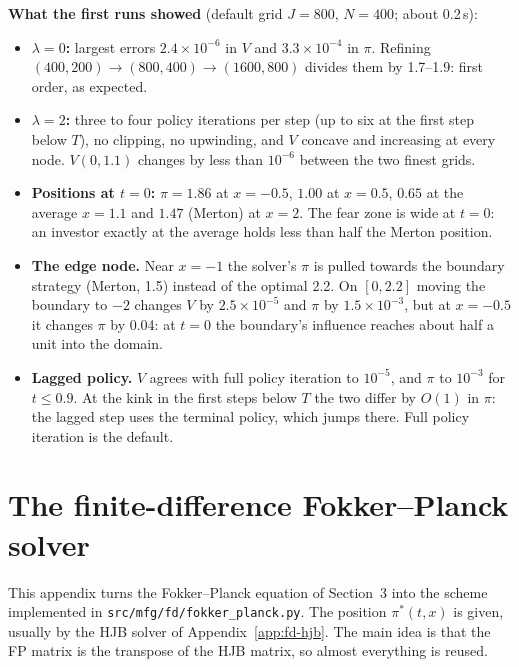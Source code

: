 \documentclass[11pt]{article}
\begin{document}
\textbf{What the first runs showed} (default grid $J=800$, $N=400$; about 0.2\,s):
\begin{itemize}
  \item \textbf{$\lambda=0$:} largest errors $2.4\times10^{-6}$ in $V$ and $3.3\times10^{-4}$ in
        $\pi$. Refining $(400,200)\to(800,400)\to(1600,800)$ divides them by 1.7--1.9: first
        order, as expected.
  \item \textbf{$\lambda=2$:} three to four policy iterations per step (up to six at the first
        step below $T$), no clipping, no upwinding, and $V$ concave and increasing at every
        node. $V(0,1.1)$ changes by less than $10^{-6}$ between the two finest grids.
  \item \textbf{Positions at $t=0$:} $\pi=1.86$ at $x=-0.5$, $1.00$ at $x=0.5$, $0.65$ at the
        average $x=1.1$ and $1.47$ (Merton) at $x=2$. The fear zone is wide at $t=0$: an
        investor exactly at the average holds less than half the Merton position.
  \item \textbf{The edge node.} Near $x=-1$ the solver's $\pi$ is pulled towards the boundary
        strategy (Merton, 1.5) instead of the optimal 2.2. On $[0,2.2]$ moving the boundary to
        $-2$ changes $V$ by $2.5\times10^{-5}$ and $\pi$ by $1.5\times10^{-3}$, but at
        $x=-0.5$ it changes $\pi$ by 0.04: at $t=0$ the boundary's influence reaches about half
        a unit into the domain.
  \item \textbf{Lagged policy.} $V$ agrees with full policy iteration to $10^{-5}$, and $\pi$
        to $10^{-3}$ for $t\le0.9$. At the kink in the first steps below $T$ the two differ by
        $O(1)$ in $\pi$: the lagged step uses the terminal policy, which jumps there. Full
        policy iteration is the default.
\end{itemize}

\section{The finite-difference Fokker--Planck solver}
\label{app:fd-fp}

This appendix turns the Fokker--Planck equation of Section~3 into the scheme implemented in
\texttt{src/mfg/fd/fokker\_planck.py}. The position $\pi^*(t,x)$ is given, usually by the HJB
solver of Appendix~\ref{app:fd-hjb}. The main idea is that the FP matrix is the transpose of the
HJB matrix, so almost everything is reused.
\end{document}
